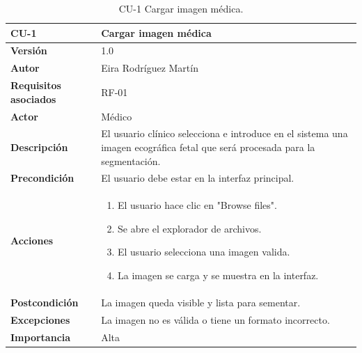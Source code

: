 \begin{table}[!h]
	\centering
	\begin{tabularx}{\linewidth}{ p{} p{} }
		\toprule
		\textbf{CU-1}    & \textbf{Cargar imagen médica}\\
		\toprule
		\textbf{Versión}              & 1.0    \\
		\textbf{Autor}                & Eira Rodríguez Martín \\
		\textbf{Requisitos asociados} & RF-01 \\
        \textbf{Actor}                & Médico \\
		\textbf{Descripción}          & El usuario clínico selecciona e introduce en el sistema una imagen ecográfica fetal que será procesada para la segmentación.\\
		\textbf{Precondición}         & El usuario debe estar en la interfaz principal. \\
		\textbf{Acciones}             &
		\begin{enumerate}
			\def\labelenumi{\arabic{enumi}.}
			\tightlist
			\item El usuario hace clic en "Browse files".
			\item Se abre el explorador de archivos.
            \item El usuario selecciona una imagen valida.
            \item La imagen se carga y se muestra en la interfaz.
		\end{enumerate}\\
		\textbf{Postcondición}        & La imagen queda visible y lista para sementar. \\
		\textbf{Excepciones}          & La imagen no es válida o tiene un formato incorrecto. \\
		\textbf{Importancia}          & Alta \\
		\bottomrule
	\end{tabularx}
	\caption{CU-1 Cargar imagen médica.}
\end{table}

